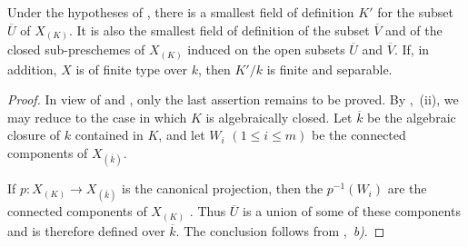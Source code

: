 \begin{corollary}[4.9.7]
\label{IV.4.9.7}
Under the hypotheses of , there is a smallest field
of definition $K'$ for the subset $\overline U$ of $X_{(K)}$.
It is also the smallest field of definition of the subset
$\overline V$ and of the closed sub-preschemes of $X_{(K)}$ induced
on the open subsets $\overline U$ and $\overline V$.
If, in addition, $X$ is of finite type over $k$, then $K'/k$ is
finite and separable.
\end{corollary}

\begin{proof}
In view of  and , only the last
assertion remains to be proved.
By ,~(ii), we may reduce to the case in which $K$ is
algebraically closed.
Let $\overline k$ be the algebraic closure of $k$ contained in $K$,
and let $W_i$ $(1\le i\le m)$ be the connected components of
$X_{(\overline k)}$.

If $p:X_{(K)}\longrightarrow X_{(\overline k)}$
is the canonical projection, then the $p^{-1}(W_i)$ are the
connected components of $X_{(K)}$ .
Thus $\overline U$ is a union of some of these components and is
therefore defined over $\overline k$.
The conclusion follows from ,~\emph{b)}.
\end{proof}
